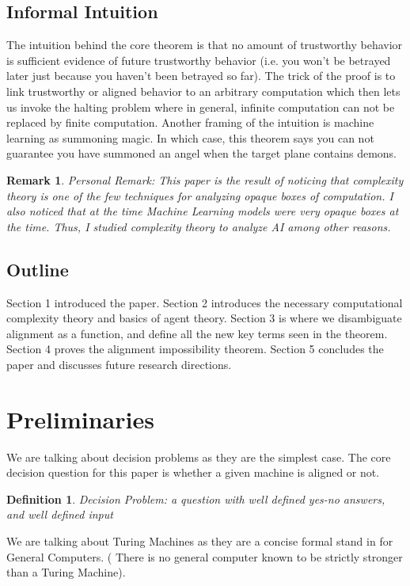 \documentclass[12pt]{article}
\newtheorem{mydef}[thm]{Definition}
\newtheorem{rem}[thm]{Remark}
\begin{document}
\subsection{Informal Intuition}
The intuition behind the core theorem is that no amount of trustworthy behavior is sufficient evidence of future trustworthy behavior (i.e. you won't be betrayed later just because you haven't been betrayed so far). The trick of the proof is to link trustworthy or aligned behavior to an arbitrary computation which then lets us invoke the halting problem where in general, infinite computation can not be replaced by finite computation.
Another framing of the intuition is machine learning as summoning magic. In which case, this theorem says you can not guarantee you have summoned an angel when the target plane contains demons.
\begin{rem}Personal Remark:
This paper is the result of noticing that complexity theory is one of the few techniques for analyzing opaque boxes of computation. I also noticed that at the time Machine Learning models were very opaque boxes at the time. Thus, I studied complexity theory to analyze AI among other reasons.
\end{rem}

\subsection{Outline}
Section 1 introduced the paper. Section 2 introduces the necessary computational complexity theory and basics of agent theory. Section 3 is where we disambiguate alignment as a function, and define all the new key terms seen in the theorem. Section 4 proves the alignment impossibility theorem. Section 5 concludes the paper and discusses future research directions.

\section{Preliminaries}
We are talking about decision problems as they are the simplest case. The core decision question for this paper is whether a given machine is aligned or not.
\begin{mydef}  Decision Problem: a question with well defined yes-no answers, and well defined input \end{mydef}

We are talking about Turing Machines as they are a concise formal stand in for General Computers. ( There is no general computer known to be strictly stronger than a Turing Machine).
\end{document}
